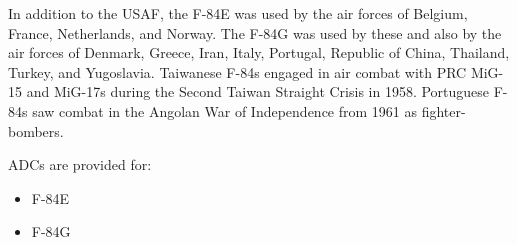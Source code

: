 In addition to the USAF, the F-84E was used by the air forces of Belgium, France, Netherlands, and Norway. The F-84G was used by these and also by the air forces of Denmark, Greece, Iran, Italy, Portugal, Republic of China, Thailand, Turkey, and Yugoslavia. Taiwanese F-84s engaged in air combat with PRC MiG-15 and MiG-17s during the Second Taiwan Straight Crisis in 1958. Portuguese F-84s saw combat in the Angolan War of Independence from 1961 as fighter-bombers.

ADCs are provided for:
\begin{itemize}
    \item F-84E
    \item F-84G
\end{itemize}